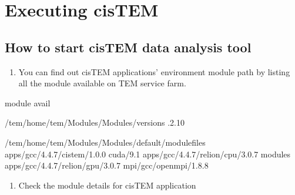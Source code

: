 \documentclass[letterpaper,10pt,english]{sphinxmanual}
\begin{document}
\section{Executing cisTEM}
\label{\detokenize{cisTEM:executing-cistem}}

\subsection{How to start cisTEM data analysis tool}
\label{\detokenize{cisTEM:how-to-start-cistem-data-analysis-tool}}\begin{enumerate}
\def\theenumi{\arabic{enumi}}
\def\labelenumi{\theenumi .}
\makeatletter\def\p@enumii{\p@enumi \theenumi .}\makeatother
\item {} 
You can find out cisTEM applications’ environment module path by listing all the module available on TEM service farm.

\end{enumerate}

\begin{sphinxVerbatim}[commandchars=\\\{\}]
\PYGZdl{}\PYGZgt{} module avail

\PYGZhy{}\PYGZhy{}\PYGZhy{}\PYGZhy{}\PYGZhy{}\PYGZhy{}\PYGZhy{}\PYGZhy{}\PYGZhy{}\PYGZhy{}\PYGZhy{}\PYGZhy{}\PYGZhy{}\PYGZhy{}\PYGZhy{}\PYGZhy{}\PYGZhy{} /tem/home/tem/Modules/Modules/versions \PYGZhy{}\PYGZhy{}\PYGZhy{}\PYGZhy{}\PYGZhy{}\PYGZhy{}\PYGZhy{}\PYGZhy{}\PYGZhy{}\PYGZhy{}\PYGZhy{}\PYGZhy{}\PYGZhy{}\PYGZhy{}\PYGZhy{}\PYGZhy{}\PYGZhy{}
.2.10

\PYGZhy{}\PYGZhy{}\PYGZhy{}\PYGZhy{}\PYGZhy{}\PYGZhy{}\PYGZhy{}\PYGZhy{}\PYGZhy{}\PYGZhy{}\PYGZhy{} /tem/home/tem/Modules/Modules/default/modulefiles \PYGZhy{}\PYGZhy{}\PYGZhy{}\PYGZhy{}\PYGZhy{}\PYGZhy{}\PYGZhy{}\PYGZhy{}\PYGZhy{}\PYGZhy{}\PYGZhy{}\PYGZhy{}
apps/gcc/4.4.7/cistem/1.0.0     cuda/9.1
apps/gcc/4.4.7/relion/cpu/3.0.7 modules
apps/gcc/4.4.7/relion/gpu/3.0.7 mpi/gcc/openmpi/1.8.8
\end{sphinxVerbatim}
\begin{enumerate}
\def\theenumi{\arabic{enumi}}
\def\labelenumi{\theenumi .}
\makeatletter\def\p@enumii{\p@enumi \theenumi .}\makeatother
\setcounter{enumi}{1}
\item {} 
Check the module details for cisTEM application

\end{enumerate}
\end{document}
